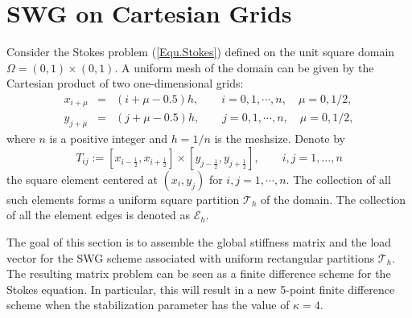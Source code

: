 \documentclass[final,leqno]{siamltex704}
\def\T{{\mathcal T}}
\def\E{{\mathcal E}}
\begin{document}
\section{SWG on Cartesian Grids}\label{sectionFDSWG}
Consider the Stokes problem (\ref{Equ.Stokes}) defined on the unit square domain $\Omega= (0,1)\times(0,1)$. A uniform mesh of the domain can be given by the Cartesian product of two one-dimensional grids:
\begin{eqnarray*}
x_{i+\mu}&=&(i+\mu-0.5)h,\qquad i=0,1,\cdots, n,\quad \mu=0,1/2,\\
y_{j+\mu}&=&(j+\mu-0.5)h, \qquad j=0,1,\cdots, n,\quad \mu=0,1/2,
\end{eqnarray*}
where $n$ is a positive integer and $h=1/n$ is the meshsize. Denote by
$$
T_{ij}:= [x_{i-\frac12}, x_{i+\frac12}]\times [y_{j-\frac12}, y_{j+\frac12}],\qquad i,j=1,\ldots, n
$$
the square element centered at $(x_i,y_j)$ for $i,j=1,\cdots, n$. The collection of all such elements forms a uniform square partition $\T_h$ of the domain. The collection of all the element edges is denoted as $\E_h$.

The goal of this section is to assemble the global stiffness matrix and the load vector for the SWG scheme associated with uniform rectangular partitions $\T_h$. The resulting matrix problem can be seen as a finite difference scheme for the Stokes equation. In particular, this will result in a new 5-point finite difference scheme when the stabilization parameter has the value of $\kappa=4$.
\end{document}
